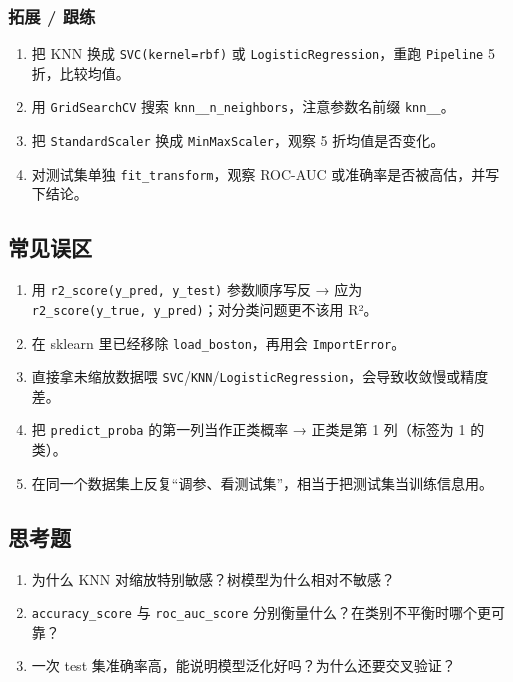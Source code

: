 \subsubsection{拓展 / 跟练}\label{ux62d3ux5c55-ux8ddfux7ec3-20}

\begin{enumerate}
\def\labelenumi{\arabic{enumi}.}
\tightlist
\item
  把 KNN 换成
  \texttt{SVC(kernel=\textquotesingle{}rbf\textquotesingle{})} 或
  \texttt{LogisticRegression}，重跑 \texttt{Pipeline} 5 折，比较均值。
\item
  用 \texttt{GridSearchCV} 搜索
  \texttt{knn\_\_n\_neighbors}，注意参数名前缀 \texttt{knn\_\_}。
\item
  把 \texttt{StandardScaler} 换成 \texttt{MinMaxScaler}，观察 5
  折均值是否变化。
\item
  对测试集单独 \texttt{fit\_transform}，观察 ROC-AUC
  或准确率是否被高估，并写下结论。
\end{enumerate}

\subsection{常见误区}\label{ux5e38ux89c1ux8befux533a-23}

\begin{enumerate}
\def\labelenumi{\arabic{enumi}.}
\tightlist
\item
  用 \texttt{r2\_score(y\_pred,\ y\_test)} 参数顺序写反 → 应为
  \texttt{r2\_score(y\_true,\ y\_pred)}；对分类问题更不该用 R²。
\item
  在 sklearn 里已经移除 \texttt{load\_boston}，再用会
  \texttt{ImportError}。
\item
  直接拿未缩放数据喂
  \texttt{SVC}/\texttt{KNN}/\texttt{LogisticRegression}，会导致收敛慢或精度差。
\item
  把 \texttt{predict\_proba} 的第一列当作正类概率 → 正类是第 1
  列（标签为 1 的类）。
\item
  在同一个数据集上反复``调参、看测试集''，相当于把测试集当训练信息用。
\end{enumerate}

\subsection{思考题}\label{ux601dux8003ux9898-25}

\begin{enumerate}
\def\labelenumi{\arabic{enumi}.}
\tightlist
\item
  为什么 KNN 对缩放特别敏感？树模型为什么相对不敏感？
\item
  \texttt{accuracy\_score} 与 \texttt{roc\_auc\_score}
  分别衡量什么？在类别不平衡时哪个更可靠？
\item
  一次 test 集准确率高，能说明模型泛化好吗？为什么还要交叉验证？
\end{enumerate}

